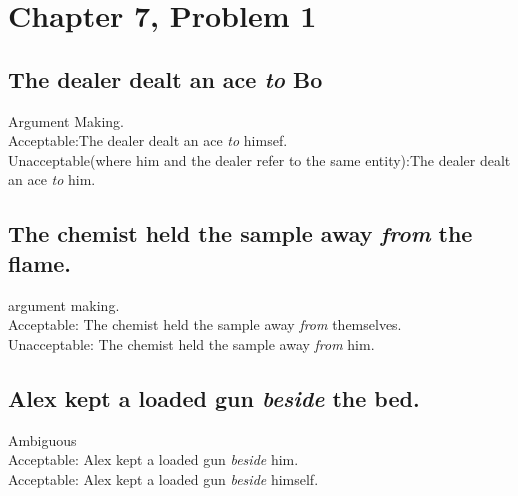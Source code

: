 \documentclass{article}
\newcommand{\comment}[1]{}
\begin{document}
\section{Chapter 7, Problem 1}
\comment{
As discussed in class yesterday, the sole test is the acceptability of reflexive v. non-reflexive pronouns in the complement of the preposition, coindexed with a suitable antecedent. Be sure not to modify the examples otherwise, lest you be testing a different verb + preposition pair. (In your example, by adding the passive verb built, you've changed the pair from have + around to build + around.)
Predicative:introduce their own predication they have their own mode and index
Argument-marking: case markers indicating the roles of NP referents in the situation denoted by the verb
In these they do not have a mode or index values. 
For prepositions that function as argument markers, however, we need to provide
some way by which they can transmit information about their object NP up to the PP
that they project. In particular, in order for the binding principles to make the right
predictions with respect to objects of argument-marking prepositions, we need to be able
(b) justify your classification by showing (with acceptable and/or unacceptable sentences) what reflexive and nonreflexive coreferential pronouns can or cannot appear as the preposition’s object.
\\ We know its argument marking because its borrowing the mode and index from its compliment
}
\subsection{The dealer dealt an ace {\it to} Bo}
Argument Making.\\
Acceptable:The dealer dealt an ace {\it to} himsef. \\
Unacceptable(where him and the dealer refer to the same entity):The dealer dealt an ace {\it to} him.
\subsection{The chemist held the sample away {\it from} the flame.}
argument making.\\
Acceptable: The chemist held the sample away {\it from} themselves. \\
Unacceptable: The chemist held the sample away {\it from} him.
\subsection{Alex kept a loaded gun {\it beside} the bed.}
Ambiguous\\
Acceptable: Alex kept a loaded gun {\it beside} him.\\
Acceptable: Alex kept a loaded gun {\it beside} himself. \\
\end{document}
